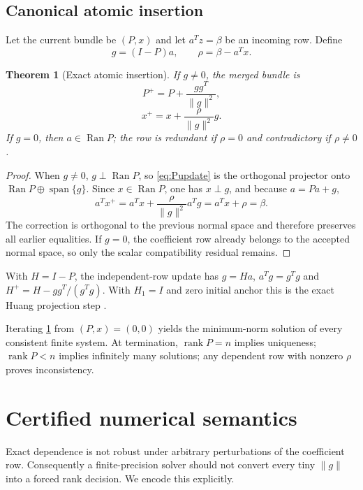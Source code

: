 \documentclass[11pt]{article}
\newtheorem{theorem}{Theorem}[section]
\theoremstyle{definition}
\newcommand{\Ran}{\operatorname{Ran}}
\newcommand{\rank}{\operatorname{rank}}
\newcommand{\Span}{\operatorname{span}}
\begin{document}
\subsection{Canonical atomic insertion}
Let the current bundle be \((P,x)\) and let \(a^Tz=\beta\) be an incoming row. Define
\begin{equation}\label{eq:grho}
g=(I-P)a,\qquad \rho=\beta-a^Tx.
\end{equation}

\begin{theorem}[Exact atomic insertion]\label{thm:atomic}
If \(g\neq0\), the merged bundle is
\begin{equation}\label{eq:Pupdate}
P^+=P+\frac{gg^T}{\|g\|^2},
\end{equation}
\begin{equation}\label{eq:xupdate}
x^+=x+\frac{\rho}{\|g\|^2}g.
\end{equation}
If \(g=0\), then \(a\in\Ran P\); the row is redundant if \(\rho=0\) and contradictory if \(\rho\neq0\).
\end{theorem}

\begin{proof}
When \(g\neq0\), \(g\perp\Ran P\), so \cref{eq:Pupdate} is the orthogonal projector onto \(\Ran P\oplus\Span\{g\}\). Since \(x\in\Ran P\), one has \(x\perp g\), and because \(a=Pa+g\),
\[
a^Tx^+=a^Tx+\frac{\rho}{\|g\|^2}a^Tg=a^Tx+\rho=\beta.
\]
The correction is orthogonal to the previous normal space and therefore preserves all earlier equalities. If \(g=0\), the coefficient row already belongs to the accepted normal space, so only the scalar compatibility residual remains.
\end{proof}

With $H=I-P$, the independent-row update has $g=Ha$, $a^Tg=g^Tg$ and $H^+=H-gg^T/(g^Tg)$. With $H_1=I$ and zero initial anchor this is the exact Huang projection step \citep{Huang1975}.

Iterating \cref{thm:atomic} from \((P,x)=(0,0)\) yields the minimum-norm solution of every consistent finite system. At termination, \(\rank P=n\) implies uniqueness; \(\rank P<n\) implies infinitely many solutions; any dependent row with nonzero \(\rho\) proves inconsistency.

\section{Certified numerical semantics}\label{sec:semantics}
Exact dependence is not robust under arbitrary perturbations of the coefficient row. Consequently a finite-precision solver should not convert every tiny \(\|g\|\) into a forced rank decision. We encode this explicitly.
\end{document}
